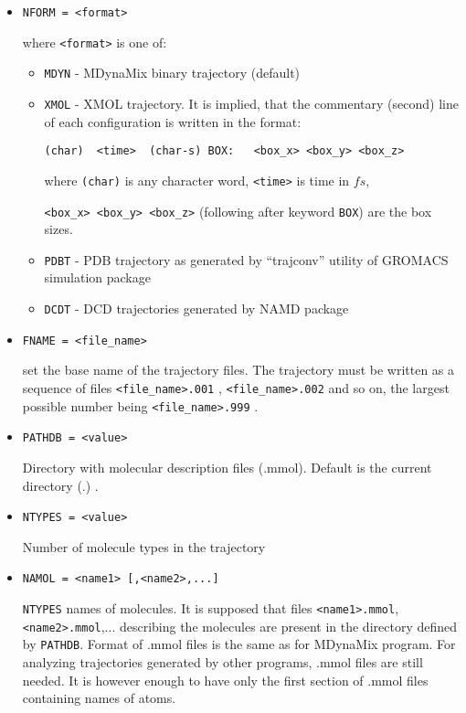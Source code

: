 \documentclass{article}
\begin{document}
\begin{itemize}

\item
\verb|NFORM = <format>|

where \verb|<format>| is one of: 

\begin{itemize}

\item
\verb|MDYN| - MDynaMix binary trajectory (default)

\item
\verb|XMOL| - XMOL trajectory. It is implied, that the commentary 
(second) line of each configuration is written in the format:

\begin{verbatim}
(char)  <time>  (char-s) BOX:   <box_x> <box_y> <box_z>
\end{verbatim}

where \verb|(char)| is any character word, \verb|<time>| is time in $fs$,

\verb|<box_x> <box_y> <box_z>| (following after keyword \verb|BOX|) are
the box sizes. 
  
\item
\verb|PDBT| - PDB trajectory as generated by ``trajconv'' utility
of GROMACS simulation package

\item
\verb|DCDT| - DCD trajectories generated by NAMD package

\end{itemize}

\item
\verb|FNAME = <file_name>|

set the base name of the trajectory files. The trajectory must be written 
as a sequence of files \verb|<file_name>.001| , \verb|<file_name>.002| and 
so on, the largest possible number being \verb|<file_name>.999| . 

\item
\verb|PATHDB = <value>|

Directory with molecular description files (.mmol). Default is the 
current directory (.) .

\item
\verb|NTYPES = <value>|

Number of molecule types in the trajectory

\item
\verb|NAMOL = <name1> [,<name2>,...]|

\verb|NTYPES| names of molecules. It is supposed that files 
\verb|<name1>.mmol|, \verb|<name2>.mmol|,... describing the molecules are
present in the directory defined by \verb|PATHDB|. Format of .mmol files is
the same as for MDynaMix program. For analyzing trajectories generated by 
other programs, .mmol files are still needed. It is however enough to have only
the first section of .mmol files containing names of atoms.


\end{itemize}
\end{document}

